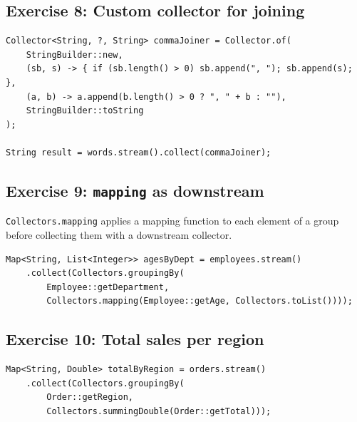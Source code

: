 \documentclass[twoside=false,DIV=14]{scrartcl}
\begin{document}
\subsection*{Exercise 8: Custom collector for joining}

\begin{lstlisting}
Collector<String, ?, String> commaJoiner = Collector.of(
    StringBuilder::new,
    (sb, s) -> { if (sb.length() > 0) sb.append(", "); sb.append(s); },
    (a, b) -> a.append(b.length() > 0 ? ", " + b : ""),
    StringBuilder::toString
);

String result = words.stream().collect(commaJoiner);
\end{lstlisting}

\subsection*{Exercise 9: \texttt{mapping} as downstream}

\texttt{Collectors.mapping} applies a mapping function to each element of a group before collecting them with a downstream collector.

\begin{lstlisting}
Map<String, List<Integer>> agesByDept = employees.stream()
    .collect(Collectors.groupingBy(
        Employee::getDepartment,
        Collectors.mapping(Employee::getAge, Collectors.toList())));
\end{lstlisting}

\subsection*{Exercise 10: Total sales per region}

\begin{lstlisting}
Map<String, Double> totalByRegion = orders.stream()
    .collect(Collectors.groupingBy(
        Order::getRegion,
        Collectors.summingDouble(Order::getTotal)));
\end{lstlisting}
\end{document}
